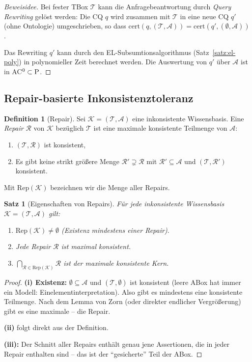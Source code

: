﻿\documentclass[a4paper,12pt]{article}
\theoremstyle{definition}
\newtheorem{definition}{Definition}[section]
\theoremstyle{plain}
\newtheorem{satz}{Satz}[section]
\theoremstyle{remark}
\newcommand{\Tbox}{\ensuremath{\mathcal{T}}}
\newcommand{\Abox}{\ensuremath{\mathcal{A}}}
\newcommand{\KB}{\ensuremath{\mathcal{K}}}
\begin{document}
\begin{proof}[Beweisidee]
Bei fester TBox $\Tbox$ kann die Anfragebeantwortung durch
\emph{Query Rewriting} gel{\"{o}}st werden:
Die CQ $q$ wird zusammen mit $\Tbox$ in eine neue CQ $q'$
(ohne Ontologie) umgeschrieben, so dass
$\mathrm{cert}(q, (\Tbox,\Abox)) = \mathrm{cert}(q', (\emptyset, \Abox))$.

Das Rewriting $q'$ kann durch den \textsf{EL}-Subsumtionsalgorithmus
(Satz~\ref{satz:el-poly}) in polynomieller Zeit berechnet werden.
Die Auswertung von $q'$ {\"{u}}ber $\Abox$ ist in \textsc{AC}$^0 \subset \textsc{P}$.
\end{proof}

\subsection{Repair-basierte Inkonsistenztoleranz}

\begin{definition}[Repair]
\label{def:repair}
Sei $\KB = (\Tbox, \Abox)$ eine inkonsistente Wissensbasis.
Eine \emph{Repair} $\mathcal{R}$ von $\KB$ bez{\"{u}}glich $\Tbox$
ist eine maximale konsistente Teilmenge von $\Abox$:
\begin{enumerate}[label=(\roman*)]
  \item $(\Tbox, \mathcal{R})$ ist konsistent,
  \item Es gibt keine strikt gr{\"{o}}{\ss}ere Menge $\mathcal{R}' \supsetneq \mathcal{R}$
        mit $\mathcal{R}' \subseteq \Abox$ und $(\Tbox, \mathcal{R}')$ konsistent.
\end{enumerate}
Mit $\mathrm{Rep}(\KB)$ bezeichnen wir die Menge aller Repairs.
\end{definition}

\begin{satz}[Eigenschaften von Repairs]
\label{satz:repairs}
F{\"{u}}r jede inkonsistente Wissensbasis $\KB = (\Tbox, \Abox)$ gilt:
\begin{enumerate}[label=(\roman*)]
  \item $\mathrm{Rep}(\KB) \neq \emptyset$
        (Existenz mindestens einer Repair).
  \item Jede Repair $\mathcal{R}$ ist maximal konsistent.
  \item $\bigcap_{\mathcal{R} \in \mathrm{Rep}(\KB)} \mathcal{R}$
        ist der maximale konsistente Kern.
\end{enumerate}
\end{satz}

\begin{proof}
\textbf{(i) Existenz:}
$\emptyset \subseteq \Abox$ und $(\Tbox, \emptyset)$ ist konsistent
(leere ABox hat immer ein Modell: Einelementinterpretation).
Also gibt es mindestens eine konsistente Teilmenge.
Nach dem Lemma von Zorn (oder direkter endlicher Vergr{\"{o}}{\ss}erung)
gibt es eine maximale -- die Repair.

\textbf{(ii)} folgt direkt aus der Definition.

\textbf{(iii):} Der Schnitt aller Repairs enth{\"{a}}lt genau jene
Assertionen, die in jeder Repair enthalten sind -- das ist der
``gesicherte'' Teil der ABox.
\qedhere
\end{proof}
\end{document}
